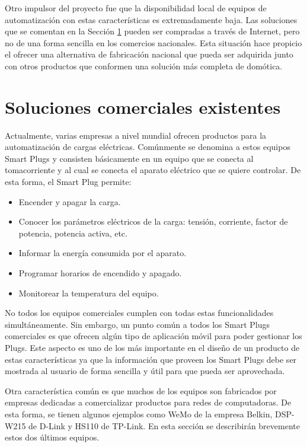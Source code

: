 Otro impulsor del proyecto fue que la disponibilidad local de equipos de automatización con estas características es extremadamente baja. Las soluciones que se comentan en la Sección \ref{section:soluciones_comerciales} pueden ser compradas a través de Internet, pero no de una forma sencilla en los comercios nacionales. Esta situación hace propicio el ofrecer una alternativa de fabricación nacional que pueda ser adquirida junto con otros productos que conformen una solución más completa de domótica.



\section{Soluciones comerciales existentes}
\label{section:soluciones_comerciales}

Actualmente, varias empresas a nivel mundial ofrecen productos para la automatización de cargas eléctricas. Comúnmente se denomina a estos equipos Smart Plugs y consisten básicamente en un equipo que se conecta al tomacorriente y al cual se conecta el aparato eléctrico que se quiere controlar. De esta forma, el Smart Plug permite:

\begin{itemize}
\item Encender y apagar la carga.
\item Conocer los parámetros eléctricos de la carga: tensión, corriente, factor de potencia, potencia activa, etc.
\item Informar la energía consumida por el aparato.
\item Programar horarios de encendido y apagado.
\item Monitorear la temperatura del equipo.
\end{itemize}

No todos los equipos comerciales cumplen con todas estas funcionalidades simultáneamente. Sin embargo, un punto común a todos los Smart Plugs comerciales es que ofrecen algún tipo de aplicación móvil para poder gestionar los Plugs. Este aspecto es uno de los más importante en el diseño de un producto de estas características ya que la información que proveen los Smart Plugs debe ser mostrada al usuario de forma sencilla y útil para que pueda ser aprovechada.

Otra característica común es que muchos de los equipos son fabricados por empresas dedicadas a comercializar productos para redes de computadoras. De esta forma, se tienen algunos ejemplos como WeMo de la empresa Belkin, DSP-W215 de D-Link y HS110 de TP-Link. En esta sección se describirán brevemente estos dos últimos equipos.

